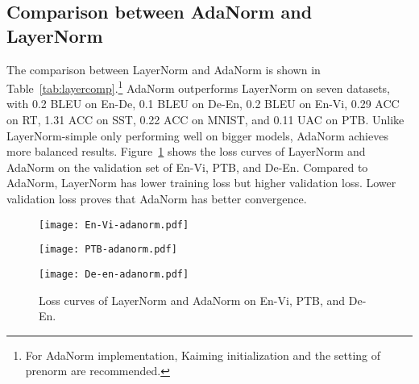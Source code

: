 \documentclass{article}
\begin{document}
  
  
\subsection{Comparison between AdaNorm and LayerNorm }
The comparison between LayerNorm and AdaNorm is shown in Table~\ref{tab:layercomp}.\footnote{For AdaNorm implementation, Kaiming initialization  and the setting of prenorm are recommended. } AdaNorm outperforms LayerNorm on seven datasets, with 0.2 BLEU on En-De, 0.1 BLEU on De-En, 0.2 BLEU on En-Vi, 0.29 ACC on RT, 1.31 ACC on SST, 0.22 ACC on MNIST, and 0.11 UAC on PTB. Unlike LayerNorm-simple only performing well on bigger models, AdaNorm achieves more balanced results. Figure~\ref{fig:test2} shows the loss curves of LayerNorm and AdaNorm on the validation set of En-Vi, PTB, and De-En. Compared to AdaNorm, LayerNorm has lower training loss but higher validation loss. Lower validation loss proves that AdaNorm  has better convergence.




\begin{figure}[h]

\centering
\small

\begin{minipage}{0.32\textwidth}
  \centering
  \texttt{[image: En-Vi-adanorm.pdf]}
\end{minipage}
\begin{minipage}{.32\textwidth}
  \centering
  \texttt{[image: PTB-adanorm.pdf]}
\end{minipage}
\begin{minipage}{.32\textwidth}
  \centering
  \texttt{[image: De-en-adanorm.pdf]}
\end{minipage}\caption{Loss curves of LayerNorm and AdaNorm on En-Vi, PTB, and De-En.}

\label{fig:test2}
\end{figure}




 













  
\end{document}
